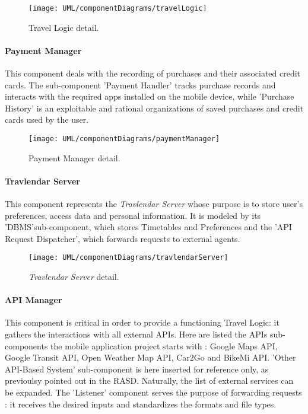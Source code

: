 		\begin{figure}[H]
			\centering
			\texttt{[image: UML/componentDiagrams/travelLogic]}
			\caption{Travel Logic detail.}
			\label{travelLogicDetail}
		\end{figure}
	

	\paragraph{Payment Manager}
		This component deals with the recording of purchases and their associated credit cards.
		The sub-component 'Payment Handler' tracks purchase records and interacts with the required apps installed on the mobile device, while 'Purchase History' is an exploitable and rational organizations of saved purchases and credit cards used by the user.

		\begin{figure}[H]
			\centering
			\texttt{[image: UML/componentDiagrams/paymentManager]}
			\caption{Payment Manager detail.}
			\label{paymentManagerDetail}
		\end{figure}
		
		
	\paragraph{Travlendar Server} 
		This component represents the \textit{Travlendar Server} whose purpose is to store user's preferences, access data and personal information. It is modeled by its 'DBMS'sub-component, which stores Timetables and Preferences and the 'API Request Dispatcher', which forwards requests to external agents.

		\begin{figure}[H]
			\centering
			\texttt{[image: UML/componentDiagrams/travlendarServer]}
			\caption{\textit{Travlendar Server} detail.}
			\label{serverDetail}
		\end{figure}


	\paragraph{API Manager} 
		This component is critical in order to provide a functioning Travel Logic: it gathers the interactions with all external APIs.
		Here are listed the APIs sub-components the mobile application project starts with : Google Maps API, Google Transit API, Open Weather Map API, Car2Go and BikeMi API.
		'Other API-Based System' sub-component is here inserted for reference only, as previoulsy pointed out in the RASD. Naturally, the list of external services can be expanded.
		The 'Listener' component serves the purpose of forwarding requests : it receives the desired inputs and standardizes the formats and file types.
	
